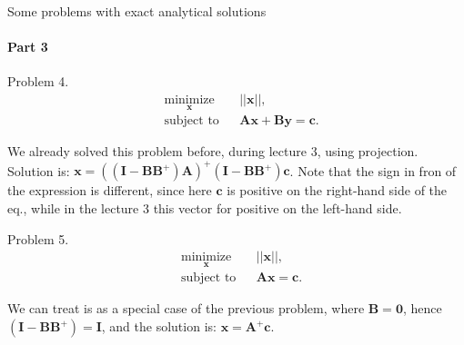 \documentclass{beamer}
\begin{document}
\begin{frame}{Some problems with exact analytical solutions}
\framesubtitle{Part 3}
\begin{flushleft}

Problem 4. 
%
\begin{equation}
\begin{aligned}
& \underset{\mathbf{x}}{\text{minimize}}
& & || \mathbf{x} ||, \\
& \text{subject to}
& & \mathbf{A} \mathbf{x} + \mathbf{B} \mathbf{y} = \mathbf{c}.
\end{aligned}
\end{equation}

We already solved this problem before, during lecture 3, using projection. Solution is: $\mathbf{x} = ((\mathbf{I} - \mathbf{B}\mathbf{B}^+) \mathbf{A})^+(\mathbf{I} - \mathbf{B}\mathbf{B}^+) \mathbf{c}$. Note that the sign in fron of the expression is different, since here $\mathbf{c}$ is positive on the right-hand side of the eq., while in the lecture 3 this vector for positive on the left-hand side. 

\bigskip

Problem 5. 
%
\begin{equation}
\begin{aligned}
& \underset{\mathbf{x}}{\text{minimize}}
& & || \mathbf{x} ||, \\
& \text{subject to}
& & \mathbf{A} \mathbf{x} = \mathbf{c}.
\end{aligned}
\end{equation}

We can treat is as a special case of the previous problem, where $\mathbf{B} = \mathbf{0}$, hence $(\mathbf{I} - \mathbf{B}\mathbf{B}^+) = \mathbf{I}$, and the solution is: $\mathbf{x} = \mathbf{A}^+\mathbf{c}$.

\end{flushleft}
\end{frame}
\end{document}
